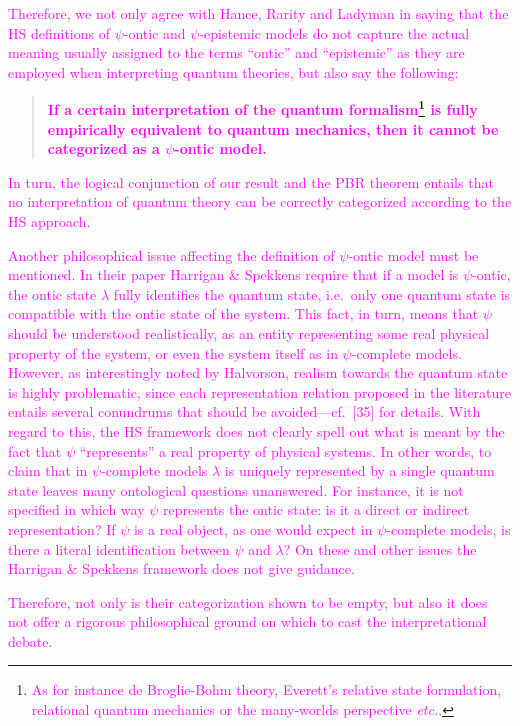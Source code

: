 \documentclass[11pt, executivepaper]{article}
\begin{document}
\begin{enumerate}
\textcolor{magenta}{Therefore, we not only agree with Hance, Rarity and Ladyman in saying that the HS definitions of $\psi$-ontic and $\psi$-epistemic models do not capture the actual meaning usually assigned to the terms ``ontic'' and ``epistemic'' as they are employed when interpreting quantum theories, but also say the following:}
\begin{quote}
	\textcolor{magenta}{\textbf{If a certain interpretation of the quantum formalism\footnote{\textcolor{magenta}{As for instance de Broglie-Bohm theory, Everett's relative state formulation, relational quantum mechanics or the many-worlds perspective \emph{etc.}.}} is fully empirically equivalent to quantum mechanics, then it cannot be categorized as a $\psi$-ontic model.}}
\end{quote}
\noindent \textcolor{magenta}{In turn, the logical conjunction of our result and the PBR theorem entails that no interpretation of quantum theory can be correctly categorized according to the HS approach.}

\textcolor{magenta}{Another philosophical issue affecting the definition of $\psi$-ontic model must be mentioned. In their paper Harrigan \& Spekkens require that if a model is $\psi$-ontic, the ontic state $\lambda$ fully identifies the quantum state, i.e.\ only one quantum state is compatible with the ontic state of the system. This fact, in turn, means that $\psi$ should be understood realistically, as an entity representing some real physical property of the system, or even the system itself as in $\psi$-complete models. However, as interestingly noted by Halvorson, realism towards the quantum state is highly problematic, since each representation relation proposed in the literature entails several conundrums that should be avoided---cf.\  [35] for details. With regard to this, the HS framework does not clearly spell out what is meant by the fact that $\psi$ ``represents'' a real property of physical systems. In other words, to claim that in $\psi$-complete models $\lambda$ is uniquely represented by a single quantum state leaves many ontological questions unanswered. For instance, it is not specified in which way $\psi$ represents the ontic state: is it a direct or indirect representation? If $\psi$ is a real object, as one would expect in $\psi$-complete models, is there a literal identification between $\psi$ and $\lambda$? On these and other issues the Harrigan \& Spekkens framework does not give guidance.} 

\textcolor{magenta}{Therefore, not only is their categorization shown to be empty, but also it does not offer a rigorous philosophical ground on which to cast the interpretational debate.}



\end{enumerate}
\end{document}
